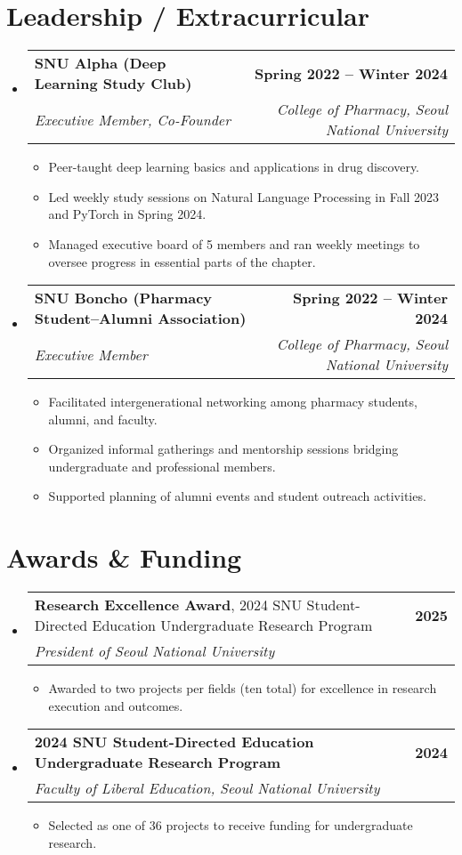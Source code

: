 \documentclass[letterpaper,11pt]{article}
\makeatletter
\newcommand{\resumeItem}[1]{
  \item\small{
    {#1 \vspace{-2pt}}
  }
}
\newcommand{\resumeSubheading}[4]{
  \vspace{-2pt}\item
    \begin{tabular*}{1.0\textwidth}[t]{l@{\extracolsep{\fill}}r}
      \textbf{#1} & \textbf{\small #2} \\
      \textit{\small#3} & \textit{\small #4} \\
    \end{tabular*}\vspace{-7pt}
}
\newcommand{\resumeSubheadingInline}[5]{
  \vspace{-2pt}\item
    \begin{tabular*}{1.0\textwidth}[t]{l@{\extracolsep{\fill}}r}
      	\textbf{#1}, {#2} & \textbf{\small #3} \\
      	\textit{\small#4} & \textit{\small #5} \\
    \end{tabular*}\vspace{-7pt}
}
\newcommand{\resumeSubHeadingListStart}{\begin{itemize}[leftmargin=0.0in, label={}]}
\newcommand{\resumeSubHeadingListEnd}{\end{itemize}}
\newcommand{\resumeItemListStart}{\begin{itemize}[leftmargin=0.2in]}
\newcommand{\resumeItemListEnd}{\end{itemize}\vspace{-5pt}}
\makeatother
\begin{document}
\section{Leadership / Extracurricular}
    \resumeSubHeadingListStart
        \resumeSubheading{SNU Alpha (Deep Learning Study Club)}{Spring 2022 -- Winter 2024}{Executive Member, Co-Founder}{College of Pharmacy, Seoul National University}
            \resumeItemListStart
                \resumeItem{Peer-taught deep learning basics and applications in drug discovery.}
                \resumeItem{Led weekly study sessions on Natural Language Processing in Fall 2023 and PyTorch in Spring 2024.}
                \resumeItem{Managed executive board of 5 members and ran weekly meetings to oversee progress in essential parts of the chapter.}
            \resumeItemListEnd
        \resumeSubheading{SNU Boncho (Pharmacy Student–Alumni Association)}{Spring 2022 -- Winter 2024}{Executive Member}{College of Pharmacy, Seoul National University}
            \resumeItemListStart
                \resumeItem{Facilitated intergenerational networking among pharmacy students, alumni, and faculty.}
                \resumeItem{Organized informal gatherings and mentorship sessions bridging undergraduate and professional members.}
                \resumeItem{Supported planning of alumni events and student outreach activities.}
            \resumeItemListEnd
    \resumeSubHeadingListEnd

\section{Awards \& Funding}
    \resumeSubHeadingListStart
        \resumeSubheadingInline{Research Excellence Award}{2024 SNU Student-Directed Education Undergraduate Research Program}{2025}{President of Seoul National University}{}
            \resumeItemListStart
                \resumeItem{Awarded to two projects per fields (ten total) for excellence in research execution and outcomes.}
            \resumeItemListEnd
        \resumeSubheading{2024 SNU Student-Directed Education Undergraduate Research Program}{2024}{Faculty of Liberal Education, Seoul National University}{}
            \resumeItemListStart
                \resumeItem{Selected as one of 36 projects to receive funding for undergraduate research.}
            \resumeItemListEnd
    \resumeSubHeadingListEnd
\end{document}
